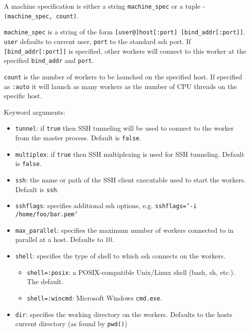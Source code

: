 \begin{adjustwidth}{2em}{0pt}
A machine specification is either a string \texttt{machine\_spec} or a tuple - \texttt{(machine\_spec, count)}.

\texttt{machine\_spec} is a string of the form \texttt{[user@]host[:port] [bind\_addr[:port]]}. \texttt{user} defaults to current user, \texttt{port} to the standard ssh port. If \texttt{[bind\_addr[:port]]} is specified, other workers will connect to this worker at the specified \texttt{bind\_addr} and \texttt{port}.

\texttt{count} is the number of workers to be launched on the specified host. If specified as \texttt{:auto} it will launch as many workers as the number of CPU threads on the specific host.

Keyword arguments:

\begin{itemize}
\item \texttt{tunnel}: if \texttt{true} then SSH tunneling will be used to connect to the worker from the master process. Default is \texttt{false}.


\item \texttt{multiplex}: if \texttt{true} then SSH multiplexing is used for SSH tunneling. Default is \texttt{false}.


\item \texttt{ssh}: the name or path of the SSH client executable used to start the workers. Default is \texttt{{\textquotedbl}ssh{\textquotedbl}}.


\item \texttt{sshflags}: specifies additional ssh options, e.g. \texttt{sshflags=`-i /home/foo/bar.pem`}


\item \texttt{max\_parallel}: specifies the maximum number of workers connected to in parallel at a host. Defaults to 10.


\item \texttt{shell}: specifies the type of shell to which ssh connects on the workers.

\begin{itemize}
\item \texttt{shell=:posix}: a POSIX-compatible Unix/Linux shell (bash, sh, etc.). The default.


\item \texttt{shell=:wincmd}: Microsoft Windows \texttt{cmd.exe}.

\end{itemize}

\item \texttt{dir}: specifies the working directory on the workers. Defaults to the host{\textquotesingle}s current directory (as found by \texttt{pwd()})



\end{itemize}
\end{adjustwidth}
